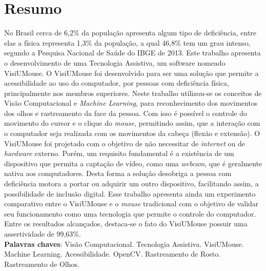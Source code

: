 \chapter*{Resumo}

{\fontsize{12pt}{\baselineskip} \selectfont \noindent {}
No Brasil cerca de 6,2\% da população apresenta algum tipo de deficiência, entre elas a física representa 1,3\% da população, a qual 46,8\% tem um grau intenso, segundo a {Pesquisa  Nacional de Saúde do IBGE de 2013}. Este trabalho apresenta o desenvolvimento de uma Tecnologia Assistiva, um software nomeado VisiUMouse. O VisiUMouse foi desenvolvido para ser uma solução que permite a acessibilidade ao uso do computador, por pessoas com deficiência física, principalmente nos membros superiores. Neste trabalho utilizou-se os conceitos de Visão Computacional e \textit{Machine Learning}, para reconhecimento dos movimentos dos olhos e rastreamento da face da pessoa. Com isso é possível o controle do movimento do cursor e o clique do \textit{mouse}, permitindo assim, que a interação com o computador seja realizada com os movimentos da cabeça (flexão e extensão). O VisiUMouse foi projetado com o objetivo de não necessitar de \textit{internet} ou de \textit{hardware} externo. Porém, um requisito fundamental é a existência de um dispositivo que permita a captação de vídeo, como uma \textit{webcam}, que é geralmente nativa aos computadores. Desta forma a solução desobriga a pessoa com deficiência motora a portar ou adquirir um outro dispositivo, facilitando assim, a possibilidade de inclusão digital. Esse trabalho apresenta ainda um experimento comparativo entre o VisiUMouse e o \textit{mouse} tradicional com o objetivo de validar seu funcionamento como uma tecnologia que permite o controle do computador. Entre os resultados alcançados, destaca-se o fato do VisiUMouse possuir uma assertividade de 99,63\%.
}
\\

\noindent \onehalfspacing {}
\textbf{Palavras chaves}: Visão Computacional. Tecnologia Assistiva. VisiUMouse. Machine Learning. Acessibilidade. OpenCV. Rastreamento de Rosto. Rastreamento de Olhos.


